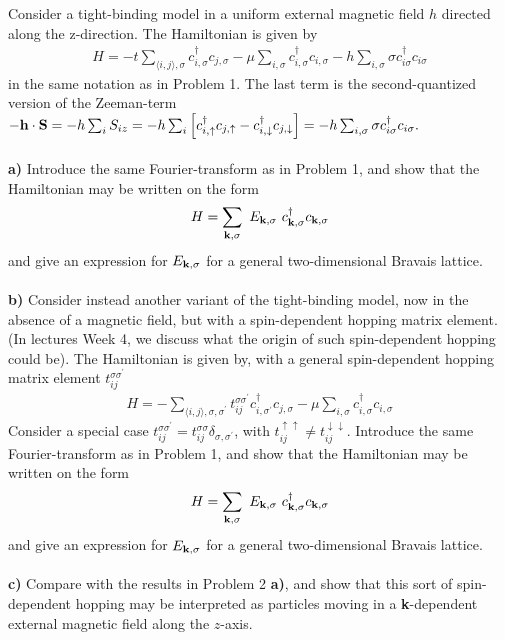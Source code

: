 \begin{problem}
	Consider a tight-binding model in a uniform external magnetic field $h$ directed along the z-direction.
	The Hamiltonian is given by 
	\begin{eqnarray}
		H = - t \sum_{\langle i,j \rangle, \sigma} c^{\dagger}_{i,\sigma} c_{j,\sigma} - \mu   \sum_{ i, \sigma} c^{\dagger}_{i,\sigma} c_{i,\sigma}
		- h \sum_{i, \sigma} \sigma c^{\dagger}_{i \sigma}  c_{i \sigma}  
		\nonumber 
	\end{eqnarray}
	in the same notation as in Problem 1. The last term is the second-quantized version of the Zeeman-term 
	$- {\bf h} \cdot {\bf S} = - h \sum_i S_{i z} = - h \sum_{i} \left[ c^{\dagger}_{i,\uparrow} c_{j,\uparrow}- c^{\dagger}_{i,\downarrow} c_{j,\downarrow} \right] =-  h \sum_{i, \sigma} \sigma c^{\dagger}_{i \sigma}  c_{i \sigma}.$
	\ \\
	\ \\
	{\bf a)} Introduce the same Fourier-transform as in Problem 1, and show that the Hamiltonian may be written on the form
	\begin{eqnarray}
		H = \sum_{{\bf k},\sigma} ~ E_{\bf k, \sigma} ~ c^{\dagger}_{{\bf k},\sigma} c_{{\bf k},\sigma}  \nonumber 
	\end{eqnarray}
	and give an expression for $E_{{\bf k},\sigma}$ for a general two-dimensional Bravais lattice. 
	\ \\
	\ \\
	{\bf b)}  Consider instead  another variant of the tight-binding model, now in the absence of a magnetic field, but with a spin-dependent hopping matrix element. (In lectures Week 4, we discuss what the origin of such spin-dependent hopping could be). The Hamiltonian is given by, with a general spin-dependent hopping matrix element $ t^{\sigma \sigma^{\prime}}_{ij}$
	\begin{eqnarray}
		H = -  \sum_{\langle i,j \rangle, \sigma, \sigma^{\prime}} t^{\sigma \sigma^{\prime}}_{ij}c^{\dagger}_{i,\sigma^{\prime}} c_{j,\sigma} - \mu   \sum_{ i, \sigma} c^{\dagger}_{i,\sigma} c_{i,\sigma}
		\nonumber 
	\end{eqnarray}
	Consider a special case $ t^{\sigma \sigma^{\prime}}_{ij} = t^{\sigma \sigma}_{ij} \delta_{\sigma,\sigma^{\prime}}$, with 
	$t_{ij}^{\uparrow \uparrow} \neq t_{ij}^{\downarrow \downarrow}$.  Introduce the same Fourier-transform as in Problem 1, and show that the Hamiltonian may be written on the form
	\begin{eqnarray}
		H = \sum_{{\bf k},\sigma} ~ E_{\bf k, \sigma} ~ c^{\dagger}_{{\bf k},\sigma} c_{{\bf k},\sigma}  \nonumber 
	\end{eqnarray}
	and give an expression for $E_{{\bf k},\sigma}$ for a general two-dimensional Bravais lattice. 
	\ \\
	\ \\
	{\bf c)} Compare with the results in Problem 2 {\bf a)}, and show that this sort of spin-dependent hopping may be interpreted as particles moving in  a {\bf k}-dependent external magnetic field along the $z$-axis.  
\end{problem}

